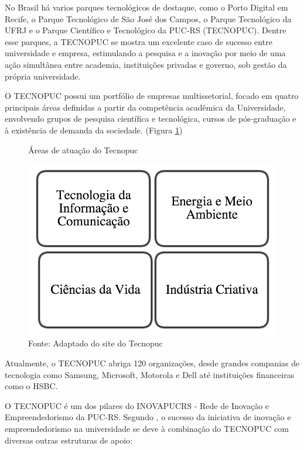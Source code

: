 No Brasil há varios parques tecnológicos de destaque, como o Porto Digital em Recife, o Parque Tecnológico de São José dos Campos, o Parque Tecnológico da UFRJ e o Parque Científico e Tecnológico da PUC-RS (TECNOPUC). Dentre esse parques, a TECNOPUC se mostra um excelente caso de sucesso entre universidade e empresa, estimulando a pesquisa e a inovação por meio de uma ação simultânea entre academia, instituições privadas e governo, sob gestão da própria universidade.

O TECNOPUC possui um portfólio de empresas multissetorial, focado em quatro principais áreas definidas a partir da competência acadêmica da Universidade, envolvendo grupos de pesquisa científica e tecnológica, cursos de pós-graduação e à existência de demanda da sociedade. (Figura \ref{fig:tecnopuc})

\begin{figure}
\caption{Áreas de atuação do Tecnopuc}
\centerline{\includegraphics[scale=0.5]{img/tecnopuc}}
\label{fig:tecnopuc}
\caption* {Fonte: Adaptado do site do Tecnopuc}
\end{figure}

Atualmente, o TECNOPUC abriga 120 organizações, desde grandes companias de tecnologia como Samsung, Microsoft, Motorola e Dell até instituições financeiras como o HSBC. 

O TECNOPUC é um dos pilares do INOVAPUCRS - Rede de Inovação e Empreendedorismo da PUC-RS. Segundo , o sucesso da iniciativa de inovação e empreendedorismo na universidade se deve à combinação do TECNOPUC com diversas outras estruturas de apoio:

